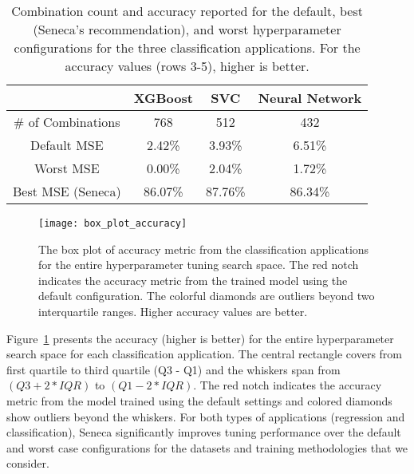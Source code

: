 \begin{table}
\centering
\begin{tabular}{|c|c|c|c|}
\hline
& XGBoost & SVC & Neural Network\\
\hline
\# of Combinations & 768 & 512 & 432\\
\hline
\hline
Default MSE&2.42\%&3.93\%&6.51\%\\
\hline
Worst MSE&0.00\%&2.04\%&1.72\%\\
\hline
Best MSE (Seneca) &86.07\%&87.76\%&86.34\%\\
\hline
\end{tabular}
\caption{Combination count and accuracy reported for the 
default, best (Seneca's recommendation), and worst hyperparameter configurations for 
the three classification applications.  
For the accuracy  values (rows 3-5), higher is better.
\label{fig:accuracy}}
\end{table}

\begin{figure}[t] \centering 
\texttt{[image: box\_plot\_accuracy]}
\caption{The box plot of accuracy metric 
from the classification applications for the entire hyperparameter tuning search space. 
The red notch indicates the accuracy metric from the trained model using the default configuration. 
The colorful diamonds are outliers beyond two interquartile ranges. Higher accuracy values are better.
\label{fig:box_plot_accuracy}}
\end{figure}

Figure~\ref{fig:box_plot_accuracy} presents the accuracy (higher is better) 
for the entire hyperparameter search space for each classification
application.  The central rectangle covers from first quartile to third quartile 
(Q3 - Q1) and the whiskers span from \texttt{$(Q3 + 2 * IQR)$} to \texttt{$(Q1 - 2 * IQR)$}. 
The red notch indicates the accuracy metric from the model trained using the default 
settings and colored diamonds show outliers beyond the whiskers.
For both types of applications (regression and classification), Seneca significantly
improves tuning performance over the default and worst case configurations for the 
datasets and training methodologies that we consider.  

